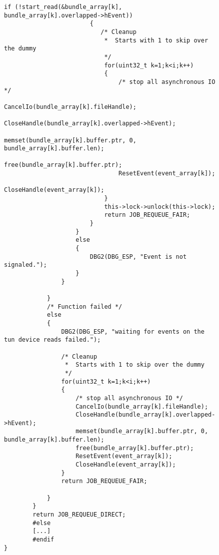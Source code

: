 \begin{figure}
\begin{lstlisting}[caption=Code für handle\_plain auf Windows]
                        if (!start_read(&bundle_array[k], bundle_array[k].overlapped->hEvent))
                        {
                           /* Cleanup
                            *  Starts with 1 to skip over the dummy
                            */
                            for(uint32_t k=1;k<i;k++)
                            {
                                /* stop all asynchronous IO */
                                CancelIo(bundle_array[k].fileHandle);
                                CloseHandle(bundle_array[k].overlapped->hEvent);
                                memset(bundle_array[k].buffer.ptr, 0, bundle_array[k].buffer.len);
                                free(bundle_array[k].buffer.ptr);
                                ResetEvent(event_array[k]);
                                CloseHandle(event_array[k]);
                            }
                            this->lock->unlock(this->lock);
                            return JOB_REQUEUE_FAIR;
                        }
                    }
                    else
                    {
                        DBG2(DBG_ESP, "Event is not signaled.");
                    }
                }

            }
            /* Function failed */
            else
            {
                DBG2(DBG_ESP, "waiting for events on the tun device reads failed.");

                /* Cleanup
                 *  Starts with 1 to skip over the dummy
                 */
                for(uint32_t k=1;k<i;k++)
                {
                    /* stop all asynchronous IO */
                    CancelIo(bundle_array[k].fileHandle);
                    CloseHandle(bundle_array[k].overlapped->hEvent);
                    memset(bundle_array[k].buffer.ptr, 0, bundle_array[k].buffer.len);
                    free(bundle_array[k].buffer.ptr);
                    ResetEvent(event_array[k]);
                    CloseHandle(event_array[k]);
                }
                return JOB_REQUEUE_FAIR;

            }
        }
        return JOB_REQUEUE_DIRECT;
        #else
        [...]
        #endif
}
\end{lstlisting}
\end{figure}

